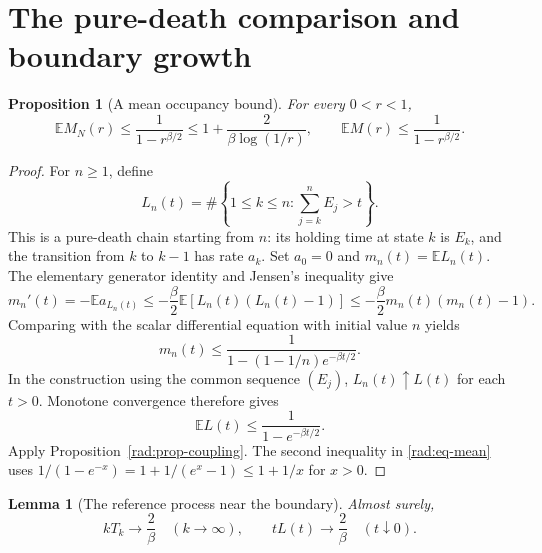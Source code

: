 \documentclass[11pt,a4paper]{article}
\numberwithin{equation}{section}
\newtheorem{proposition}[theorem]{Proposition}
\newtheorem{lemma}[theorem]{Lemma}
\theoremstyle{definition}
\theoremstyle{remark}
\newcommand{\E}{\mathbb E}
\begin{document}
\section{The pure-death comparison and boundary growth}
\label{rad:section-boundary}

\begin{proposition}[A mean occupancy bound]
\label{rad:prop-mean}
For every $0<r<1$,
\begin{equation}
 \E M_N(r)\leq\frac{1}{1-r^{\beta/2}}
 \leq1+\frac{2}{\beta\log(1/r)},\qquad
 \E M(r)\leq\frac{1}{1-r^{\beta/2}}.
 \label{rad:eq-mean}
\end{equation}
\end{proposition}

\begin{proof}
For $n\geq1$, define
\[
 L_n(t)=\#\left\{1\leq k\leq n:
               \sum_{j=k}^n E_j>t\right\}.
\]
This is a pure-death chain starting from $n$: its holding time at state
$k$ is $E_k$, and the transition from $k$ to $k-1$ has rate $a_k$.
Set $a_0=0$ and $m_n(t)=\E L_n(t)$. The elementary generator identity and Jensen's
inequality give
\[
 m_n'(t)=-\E a_{L_n(t)}
 \leq-\frac{\beta}{2}\E[L_n(t)(L_n(t)-1)]
 \leq-\frac{\beta}{2}m_n(t)(m_n(t)-1).
\]
Comparing with the scalar differential equation with initial value
$n$ yields
\[
 m_n(t)\leq
 \frac{1}{1-(1-1/n)e^{-\beta t/2}}.
\]
In the construction using the common sequence $(E_j)$,
$L_n(t)\uparrow L(t)$ for each $t>0$.  Monotone convergence therefore
gives
\[
 \E L(t)\leq\frac{1}{1-e^{-\beta t/2}}.
\]
Apply Proposition~\ref{rad:prop-coupling}.  The second inequality in
\eqref{rad:eq-mean} uses
$1/(1-e^{-x})=1+1/(e^x-1)\leq1+1/x$ for $x>0$.
\end{proof}

\begin{lemma}[The reference process near the boundary]
\label{rad:lem-reference-growth}
Almost surely,
\begin{equation}
 kT_k\longrightarrow\frac{2}{\beta}\quad(k\to\infty),
 \qquad
 tL(t)\longrightarrow\frac{2}{\beta}\quad(t\downarrow0).
 \label{rad:eq-reference-growth}
\end{equation}
\end{lemma}
\end{document}
